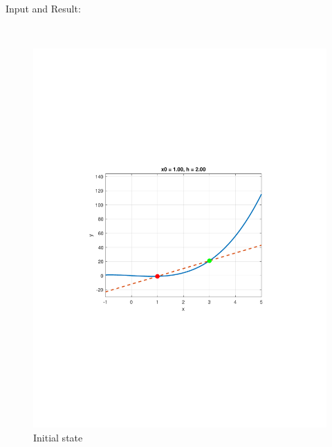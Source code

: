 \documentclass[13pt,a4paper]{report}
\begin{document}
\newpage
Input and Result:\\[-0.35cm]
\begin{figure}[H]
    \centering
    \\
    \begin{minipage}{0.45\textwidth}
        \centering
        \includegraphics[trim={4.5cm 8.35cm 3.25cm 8cm},clip,scale=0.6]{pdfs/derivative.pdf}
        \caption{Initial state}
    \end{minipage}\hfill
    \begin{minipage}{0.45\textwidth}
        \centering

\end{minipage}
\end{figure}
\end{document}
